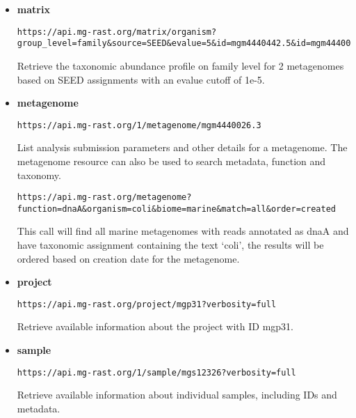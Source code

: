\begin{itemize}
\item
\textbf{matrix}
\begin{small}
\begin{lstlisting}
https://api.mg-rast.org/matrix/organism?group_level=family&source=SEED&evalue=5&id=mgm4440442.5&id=mgm4440026.3
\end{lstlisting}
\end{small}
Retrieve the taxonomic abundance profile on family level for 2 metagenomes based on SEED assignments with an evalue cutoff of 1e-5.

\item
\textbf{metagenome}
\begin{small}
\begin{lstlisting}
https://api.mg-rast.org/1/metagenome/mgm4440026.3
\end{lstlisting}
\end{small} List analysis submission parameters and other details for a metagenome.
\newline
The metagenome resource can also be used to search metadata, function and taxonomy.  
\begin{small}
\begin{lstlisting}
https://api.mg-rast.org/metagenome?function=dnaA&organism=coli&biome=marine&match=all&order=created
\end{lstlisting}
\end{small} This call will find all marine metagenomes with reads annotated as dnaA and have taxonomic assignment containing the text `coli', the results will be ordered based on creation date for the metagenome.

\item
\textbf{project}
\begin{small}
\begin{lstlisting}
https://api.mg-rast.org/project/mgp31?verbosity=full
\end{lstlisting}
\end{small} Retrieve available information about the project with ID mgp31.

\item
\textbf{sample}
\begin{small}
\begin{lstlisting}
https://api.mg-rast.org/1/sample/mgs12326?verbosity=full
\end{lstlisting}
\end{small} Retrieve available information about individual samples, including IDs and metadata.


\end{itemize}
